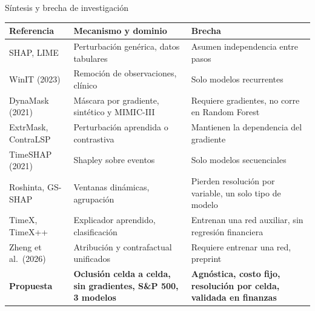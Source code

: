 \documentclass{beamer}
\begin{document}
\begin{frame}{Síntesis y brecha de investigación}
    \tiny
    \begin{center}
    \renewcommand{\arraystretch}{1.2}
    \begin{tabular}{@{}>{\raggedright\arraybackslash}p{2.6cm}>{\raggedright\arraybackslash}p{3.6cm}>{\raggedright\arraybackslash}p{3.6cm}@{}}
    \toprule
    \textbf{Referencia} & \textbf{Mecanismo y dominio} & \textbf{Brecha} \\
    \midrule
    SHAP, LIME & Perturbación genérica, datos tabulares & Asumen independencia entre pasos \\
    WinIT (2023) & Remoción de observaciones, clínico & Solo modelos recurrentes \\
    DynaMask (2021) & Máscara por gradiente, sintético y MIMIC-III & Requiere gradientes, no corre en Random Forest \\
    ExtrMask, ContraLSP & Perturbación aprendida o contrastiva & Mantienen la dependencia del gradiente \\
    TimeSHAP (2021) & Shapley sobre eventos & Solo modelos secuenciales \\
    Roshinta, GS-SHAP & Ventanas dinámicas, agrupación & Pierden resolución por variable, un solo tipo de modelo \\
    TimeX, TimeX++ & Explicador aprendido, clasificación & Entrenan una red auxiliar, sin regresión financiera \\
    Zheng et al.\ (2026) & Atribución y contrafactual unificados & Requiere entrenar una red, preprint \\
    \midrule
    \textbf{Propuesta} & \textbf{Oclusión celda a celda, sin gradientes, S\&P 500, 3 modelos} & \textbf{Agnóstica, costo fijo, resolución por celda, validada en finanzas} \\
    \bottomrule
    \end{tabular}
    \end{center}
\end{frame}
\end{document}
